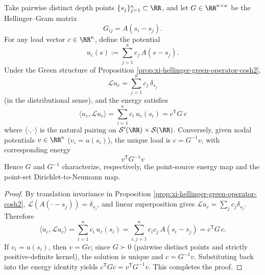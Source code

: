 \begin{proposition}\label{prop:xi-hellinger-charge-potential-duality-dtn}
Take pairwise distinct depth points \(\{s_j\}_{j=1}^\kappa\subset\RR\), and let \(G\in\RR^{\kappa\times\kappa}\) be the Hellinger--Gram matrix
\[
G_{ij}=A(s_i-s_j).
\]
For any load vector \(c\in\RR^\kappa\), define the potential
\[
u_c(s):=\sum_{j=1}^{\kappa}c_j\,A(s-s_j).
\]
Under the Green structure of Proposition \ref{prop:xi-hellinger-green-operator-cosh2},
\[
\mathcal L u_c=\sum_{j=1}^{\kappa}c_j\,\delta_{s_j}
\]
(in the distributional sense), and the energy satisfies
\[
\boxed{\;
\langle u_c,\mathcal L u_c\rangle
=\sum_{i=1}^{\kappa}c_i\,u_c(s_i)
=c^{\mathsf T}G\,c\;}
\]
where \(\langle\cdot,\cdot\rangle\) is the natural pairing on \(\mathcal S'(\RR)\times\mathcal S(\RR)\).
Conversely, given nodal potentials \(v\in\RR^\kappa\) (\(v_i=u(s_i)\)), the unique load is \(c=G^{-1}v\), with corresponding energy
\[
\boxed{\;v^{\mathsf T}G^{-1}v\;}
\]
Hence \(G\) and \(G^{-1}\) characterize, respectively, the point-source energy map and the point-set Dirichlet-to-Neumann map.
\end{proposition}
\begin{proof}
By translation invariance in Proposition \ref{prop:xi-hellinger-green-operator-cosh2}, \(\mathcal L(A(\cdot-s_j))=\delta_{s_j}\), and linear superposition gives \(\mathcal L u_c=\sum_j c_j\delta_{s_j}\).
Therefore
\[
\langle u_c,\mathcal L u_c\rangle
=\sum_{i=1}^{\kappa}c_i\,u_c(s_i)
=\sum_{i,j=1}^{\kappa}c_i c_j\,A(s_i-s_j)
=c^{\mathsf T}G\,c.
\]
If \(v_i=u(s_i)\), then \(v=Gc\); since \(G\succ0\) (pairwise distinct points and strictly positive-definite kernel), the solution is unique and \(c=G^{-1}v\).
Substituting back into the energy identity yields \(c^{\mathsf T}G c=v^{\mathsf T}G^{-1}v\). This completes the proof.
\end{proof}

